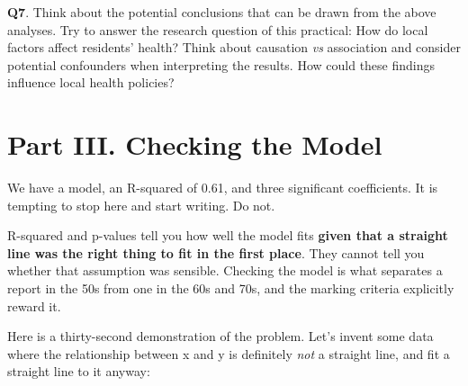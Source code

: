 \documentclass[
  letterpaper,
  DIV=11,
  numbers=noendperiod]{scrreprt}
\newenvironment{Shaded}{\begin{snugshade}}{\end{snugshade}}
\newcommand{\AttributeTok}[1]{\textcolor[rgb]{0.40,0.45,0.13}{#1}}
\newcommand{\CommentTok}[1]{\textcolor[rgb]{0.37,0.37,0.37}{#1}}
\newcommand{\DecValTok}[1]{\textcolor[rgb]{0.68,0.00,0.00}{#1}}
\newcommand{\FunctionTok}[1]{\textcolor[rgb]{0.28,0.35,0.67}{#1}}
\newcommand{\NormalTok}[1]{\textcolor[rgb]{0.00,0.23,0.31}{#1}}
\newcommand{\OtherTok}[1]{\textcolor[rgb]{0.00,0.23,0.31}{#1}}
\newcommand{\SpecialCharTok}[1]{\textcolor[rgb]{0.37,0.37,0.37}{#1}}
\begin{document}
\textbf{Q7}. Think about the potential conclusions that can be drawn
from the above analyses. Try to answer the research question of this
practical: How do local factors affect residents' health? Think about
causation \emph{vs} association and consider potential confounders when
interpreting the results. How could these findings influence local
health policies?

\section{Part III. Checking the
Model}\label{part-iii.-checking-the-model}

We have a model, an R-squared of 0.61, and three significant
coefficients. It is tempting to stop here and start writing. Do not.

R-squared and p-values tell you how well the model fits \textbf{given
that a straight line was the right thing to fit in the first place}.
They cannot tell you whether that assumption was sensible. Checking the
model is what separates a report in the 50s from one in the 60s and 70s,
and the marking criteria explicitly reward it.

Here is a thirty-second demonstration of the problem. Let's invent some
data where the relationship between x and y is definitely \emph{not} a
straight line, and fit a straight line to it anyway:

\begin{Shaded}
\end{Shaded}
\end{document}
